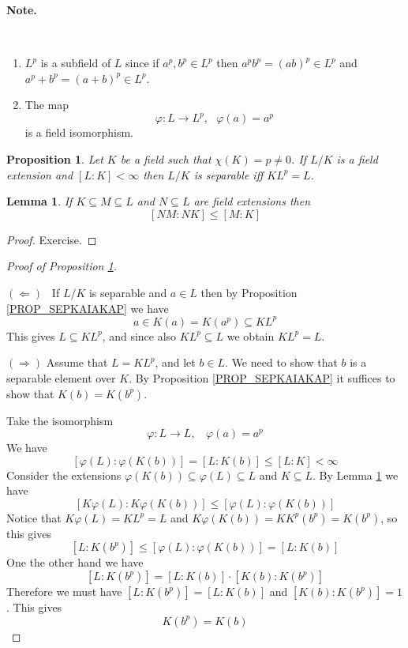 \documentclass[12pt, letterpaper, oneside]{article}
\theoremstyle{plain}
\newtheorem{lemma}[theorem]{Lemma}
\newtheorem{proposition}[theorem]{Proposition}
\theoremstyle{definition}
\newcommand{\benu}{\begin{enumerate}}
\newcommand{\eenu}{\end{enumerate}}
\newcommand{\vs}{\vskip 5mm}
\begin{document}
\vs

\textbf{Note.}

\vskip -13mm

\ 
\benu 
\item $L^{p}$ is a subfield of $L$ since if $a^{p}, b^{p}\in L^{p}$ 
then $a^{p}b^{p} = (ab)^{p}\in L^{p}$ and $a^{p}+b^{p} = (a+b)^{p} \in L^{p}$.

\item  The map 
$$\varphi\colon L \to L^{p}, \ \ \ \varphi(a) = a^{p}$$
is a field isomorphism.
\eenu


\vs\vs

\begin{proposition}
\label{PROP_SEPEXTKLPISL}
Let $K$ be a field such that $\chi(K)= p\neq 0$. If $L/K$ is a field extension and $[L:K] < \infty$
then $L/K$ is separable iff $KL^{p} = L$.
\end{proposition}


\vs\vs

\begin{lemma}
\label{LEMMA_NM:NK}
If $K\subseteq M \subseteq L$ and $N \subseteq L$ are field extensions then 
$$[NM: NK] \leq [M:K]$$
\end{lemma}

\vs

\begin{proof}
Exercise. 
\end{proof}


\vs\vs

\begin{proof}[Proof of Proposition \ref{PROP_SEPEXTKLPISL}] \ 


$(\Leftarrow)$ \ If $L/K$ is separable and $a\in L$ then by Proposition \ref{PROP_SEPKAIAKAP}
we have 
$$a \in K(a) = K(a^{p})\subseteq KL^{p}$$
This gives $L\subseteq KL^{p}$, and since also $KL^{p}\subseteq L$ we obtain $KL^{p}= L$.


\vs

$(\Rightarrow)$ Assume that $L= KL^{p}$, and let $b\in L$. We need to show that 
$b$ is a separable element over $K$. By Proposition \ref{PROP_SEPKAIAKAP} it suffices 
to show that $K(b) = K(b^{p})$.

Take the isomorphism 
$$\varphi\colon L\to L,  \ \ \ \ \varphi(a)= a^{p}$$
We have
$$[\varphi(L): \varphi(K(b))] = [L : K(b)] \leq [L: K] < \infty$$
Consider the extensions $\varphi(K(b))\subseteq \varphi(L) \subseteq L$ and $K\subseteq L$. 
By Lemma \ref{LEMMA_NM:NK} we have 
$$[K\varphi(L): K\varphi(K(b))] \leq [\varphi(L): \varphi(K(b))]$$
Notice that  $K\varphi(L) = KL^{p} = L$ and $K\varphi(K(b)) = KK^{p}(b^{p}) = K(b^{p})$, so this gives
$$[L:K(b^{p})] \leq [\varphi(L): \varphi(K(b))]  = [L:K(b)]$$
One the other hand we have 
$$[L:K(b^{p})] = [L:K(b)]\cdot [K(b):K(b^{p})]$$
Therefore we must have $[L:K(b^{p})] = [L:K(b)]$ and $[K(b):K(b^{p})]=1$. This gives 
$$K(b^{p}) = K(b)$$
\end{proof}
\end{document}
